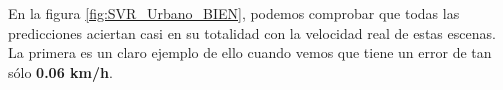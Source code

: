 En la figura \ref{fig:SVR_Urbano_BIEN}, podemos comprobar que todas las predicciones aciertan casi en su totalidad con la velocidad real de estas escenas. La primera es un claro ejemplo de ello cuando vemos que tiene un error de tan sólo \textbf{0.06 km/h}.





